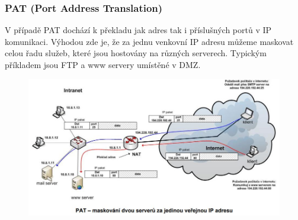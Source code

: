 \subsubsection{PAT (Port Address Translation)}
V případě PAT dochází k překladu jak adres tak i příslušných portů v IP komunikaci. Výhodou zde je, že za jednu venkovní IP adresu můžeme maskovat celou řadu služeb, které jsou hostovány na různých serverech. Typickým příkladem jsou FTP a www servery umístěné v DMZ. 
\begin{figure}[H]
\centering
\includegraphics[width=1\textwidth]{assets/6_pat_mask}
\end{figure}